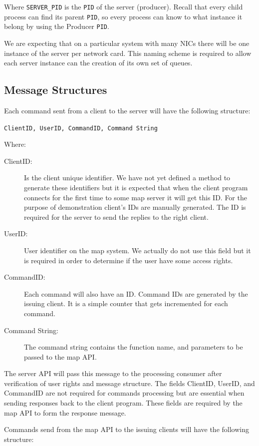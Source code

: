 \documentclass[10pt]{article}
\begin{document}
Where \texttt{SERVER\_PID} is the \texttt{PID} of the server (producer). Recall
that every child process can find its parent \texttt{PID}, so every process can
know to what instance it belong by using the Producer \texttt{PID}.

We are expecting that on a particular system with many NICs there will be one
instance of the server per network card. This naming scheme is required to
allow each server instance can the creation of its own set of queues.

\subsection{Message Structures}
Each command sent from a client to the server will have the following structure:

\texttt{ClientID, UserID, CommandID, Command String}

Where:

\begin{description}
\item [{ClientID:}] Is the client unique identifier. We have not yet defined a
  method to generate these identifiers but it is expected that when the client
  program connects for the first time to some map server it will get this ID.
  For the purpose of demonstration client's IDs are manually generated. The ID is
  required for the server to send the replies to the right client.
\item[{UserID}:] User identifier on the map system. We actually do not use this
  field but it is required in order to determine if the user have some access rights.   
\item [{CommandID:}] Each command will also have an ID. Command IDs are
  generated by the issuing client. It is a simple counter that gets incremented
  for each command.
\item [{Command String:}] The command string contains the function name, and
  parameters to be passed to the map API.
\end{description}

The server API will pass this message to the processing consumer after
verification of user rights and message structure. The fields ClientID, UserID,
and CommandID are not required for commands processing but are essential when
sending responses back to the client program. These fields are required by the
map API to form the response message.

Commands send from the map API to the issuing clients will have the following structure:
\end{document}
